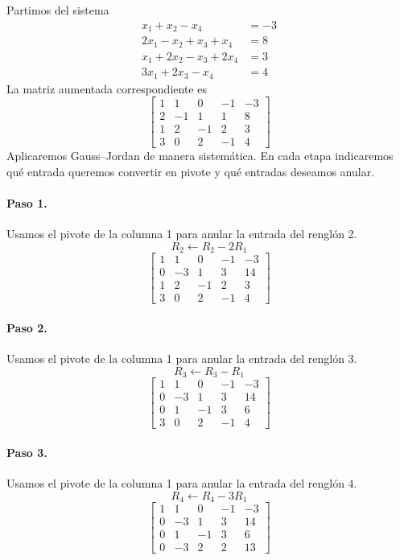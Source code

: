 \documentclass[12pt]{article}
\theoremstyle{remark}
\begin{document}
Partimos del sistema
\[
\begin{aligned}
x_{1} + x_{2} - x_{4} &= -3\\
2 x_{1} - x_{2} + x_{3} + x_{4} &= 8\\
x_{1} + 2 x_{2} - x_{3} + 2 x_{4} &= 3\\
3 x_{1} + 2 x_{3} - x_{4} &= 4
\end{aligned}
\]
La matriz aumentada correspondiente es
\[
\left[\begin{array}{cccc|c}
1 & 1 & 0 & -1 & -3\\
2 & -1 & 1 & 1 & 8\\
1 & 2 & -1 & 2 & 3\\
3 & 0 & 2 & -1 & 4
\end{array}\right]
\]
Aplicaremos Gauss--Jordan de manera sistemática. En cada etapa indicaremos qué entrada queremos convertir en pivote y qué entradas deseamos anular.
\paragraph{Paso 1.} Usamos el pivote de la columna 1 para anular la entrada del renglón 2.
\[
R_{2}\leftarrow R_{2}-2R_{1}
\]
\[
\left[\begin{array}{cccc|c}
1 & 1 & 0 & -1 & -3\\
0 & -3 & 1 & 3 & 14\\
1 & 2 & -1 & 2 & 3\\
3 & 0 & 2 & -1 & 4
\end{array}\right]
\]
\paragraph{Paso 2.} Usamos el pivote de la columna 1 para anular la entrada del renglón 3.
\[
R_{3}\leftarrow R_{3}-R_{1}
\]
\[
\left[\begin{array}{cccc|c}
1 & 1 & 0 & -1 & -3\\
0 & -3 & 1 & 3 & 14\\
0 & 1 & -1 & 3 & 6\\
3 & 0 & 2 & -1 & 4
\end{array}\right]
\]
\paragraph{Paso 3.} Usamos el pivote de la columna 1 para anular la entrada del renglón 4.
\[
R_{4}\leftarrow R_{4}-3R_{1}
\]
\[
\left[\begin{array}{cccc|c}
1 & 1 & 0 & -1 & -3\\
0 & -3 & 1 & 3 & 14\\
0 & 1 & -1 & 3 & 6\\
0 & -3 & 2 & 2 & 13
\end{array}\right]
\]
\end{document}
